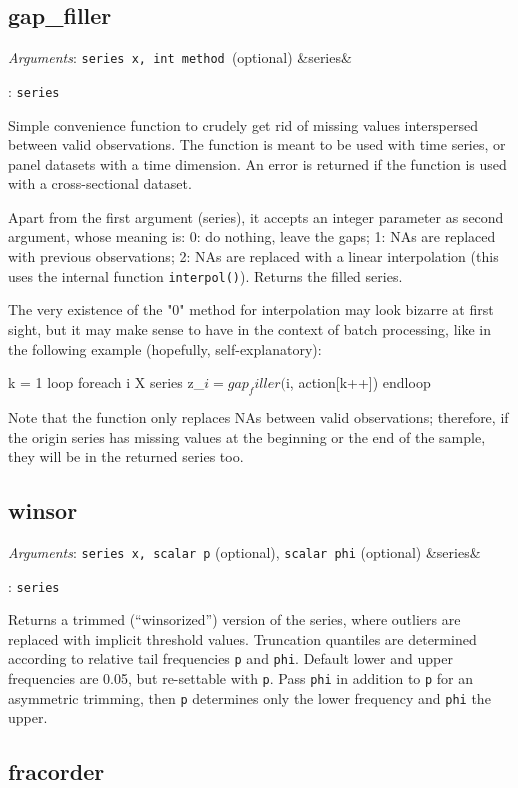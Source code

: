 \documentclass[11pt,english]{article}
\newcommand{\ArgRet}[2]{%
  {\it Arguments}: {#1}%
  \ifx&#2&%
  \else
  \par\smallskip\noindent {\it Return type}: \texttt{#2}
  \fi%
  \par\medskip\par%
  }
\begin{document}
\subsection{gap\_filler}

\ArgRet{\texttt{series x, int method }(optional)}{series}

Simple convenience function to crudely get rid of missing values
interspersed between valid observations. The function is meant to be
used with time series, or panel datasets with a time dimension. An
error is returned if the function is used with a cross-sectional
dataset.

Apart from the first argument (series), it accepts an integer
parameter as second argument, whose meaning is: 0: do nothing, leave
the gaps; 1: NAs are replaced with previous observations; 2: NAs are
replaced with a linear interpolation (this uses the internal function
\texttt{interpol()}). Returns the filled series.

The very existence of the "0" method for interpolation may look
bizarre at first sight, but it may make sense to have in the context
of batch processing, like in the following example (hopefully,
self-explanatory):
\begin{code}
k = 1
loop foreach i X
   series z_$i = gap_filler($i, action[k++])
endloop
\end{code}

Note that the function only replaces NAs between valid observations;
therefore, if the origin series has missing values at the beginning or
the end of the sample, they will be in the returned series too.

\subsection{winsor}

\ArgRet{\texttt{series x, scalar p} (optional), \texttt{scalar
phi} (optional)}{series}

Returns a trimmed (``winsorized'') version
of the series, where outliers are replaced with implicit threshold
values. Truncation quantiles are determined according to relative
tail frequencies \texttt{p} and \texttt{phi}. Default lower and upper
frequencies are 0.05, but re-settable with \texttt{p}. Pass \texttt{phi}
in addition to \texttt{p} for an asymmetric trimming, then \texttt{p}
determines only the lower frequency and \texttt{phi} the upper.

\subsection{fracorder}
\end{document}
